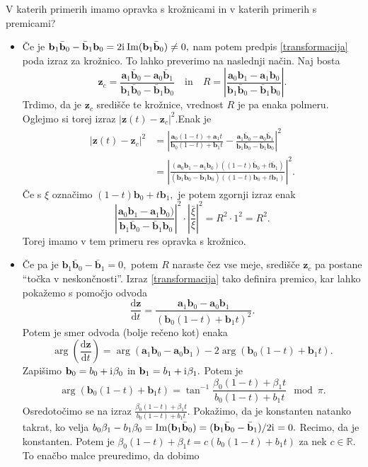 \documentclass[12pt,a4paper,twoside]{article}
\newcommand{\iu}{\mathrm{i}\mkern1mu} %
\theoremstyle{definition} %
\theoremstyle{plain} %
\numberwithin{equation}{section}  %
\newcommand{\R}{\mathbb R}
\newcommand{\aV}{\mathbf{a}}
\newcommand{\bV}{\mathbf{b}}
\newcommand{\zV}{\mathbf{z}}
\newcommand{\dFrac}[2][t]{\frac{\mathrm{d}#2}{\mathrm{d}#1}} %
\DeclareMathOperator{\ImC}{Im}
\begin{document}
V katerih primerih imamo opravka s krožnicami in v katerih primerih s premicami?
\begin{itemize}
	\item Če je $\bV_1\bar{\bV}_0-\bar{\bV}_1\bV_0=2\iu\ImC(\bV_1\bar{\bV}_0)\neq 0,$ nam potem predpis \eqref{transformacija} poda izraz za krožnico. To lahko preverimo na naslednji način. Naj bosta
	\begin{equation*}
		\zV_c=\frac{\aV_1\bar{\bV}_0-\aV_0\bar{\bV}_1}{\bV_1\bar{\bV}_0-\bar{\bV}_1\bV_0}\quad\text{in}\quad R=\left|\frac{\aV_0\bV_1-\aV_1\bV_0}{\bV_1\bar{\bV}_0-\bar{\bV}_1\bV_0}\right|.
	\end{equation*}
	Trdimo, da je $\zV_c$ središče te krožnice, vrednost $R$ je pa enaka polmeru. Oglejmo si torej izraz $|\zV(t)-\zV_c|^2.$Enak je
	\begin{align*}
		|\zV(t)-\zV_c|^2&=\left|\frac{\aV_0(1-t)+\aV_1t}{\bV_0(1-t)+\bV_1t}-\frac{\aV_1\bar{\bV}_0-\aV_0\bar{\bV}_1}{\bV_1\bar{\bV}_0-\bar{\bV}_1\bV_0}\right|^2\\
		&=\left|\frac{(\aV_0\bV_1-\aV_1\bV_0)((1-t)\bar{\bV}_0+t\bar{\bV}_1)}{(\bV_1\bar{\bV}_0-\bar{\bV}_1\bV_0)((1-t)\bV_0+t\bV_1)}\right|^2.
	\end{align*}
	Če s $\xi$ označimo $(1-t)\bV_0+t\bV_1,$ je potem zgornji izraz enak
	\begin{equation*}
		\left|\frac{\aV_0\bV_1-\aV_1\bV_0)}{\bV_1\bar{\bV}_0-\bar{\bV}_1\bV_0}\right|^2\cdot\left|\frac{\bar{\xi}}{\xi}\right|^2=R^2\cdot1^2=R^2.
	\end{equation*}
	Torej imamo v tem primeru res opravka s krožnico.
	\item Če pa je $\bV_1\bar{\bV}_0-\bar{\bV}_1=0,$ potem $R$ naraste čez vse meje, središče $\zV_c$ pa postane ``točka v neskončnosti''. Izraz \eqref{transformacija} tako definira premico, kar lahko pokažemo s pomočjo odvoda
	\begin{equation*}
		\dFrac{\zV}=\frac{\aV_1\bV_0-\aV_0\bV_1}{(\bV_0(1-t)+\bV_1t)^2}.
	\end{equation*}
	Potem je smer odvoda (bolje rečeno kot) enaka
	\begin{equation*}
		\arg\left(\dFrac{\zV}\right)=\arg(\aV_1\bV_0-\aV_0\bV_1)-2\arg(\bV_0(1-t)+\bV_1t).
	\end{equation*}
	Zapišimo $\bV_0=b_0+\iu\beta_0$ in $\bV_1=b_1+\iu\beta_1.$ Potem je
	\begin{equation*}
		\arg(\bV_0(1-t)+\bV_1t)=\tan^{-1}\frac{\beta_0(1-t)+\beta_1t}{b_0(1-t)+b_1t}\mod\pi.
	\end{equation*}
	Osredotočimo se na izraz $\frac{\beta_0(1-t)+\beta_1t}{b_0(1-t)+b_1t}.$ Pokažimo, da je konstanten natanko takrat, ko  velja $b_0\beta_1-b_1\beta_0=\ImC(\bV_1\bar{\bV}_0)=(\bV_1\bar{\bV}_0-\bar{\bV}_1)/2\iu=0.$ Recimo, da je konstanten. Potem je $\beta_0(1-t)+\beta_1t=c(b_0(1-t)+b_1t)$ za nek $c\in\R.$ To enačbo malce preuredimo, da dobimo

\end{itemize}
\end{document}
